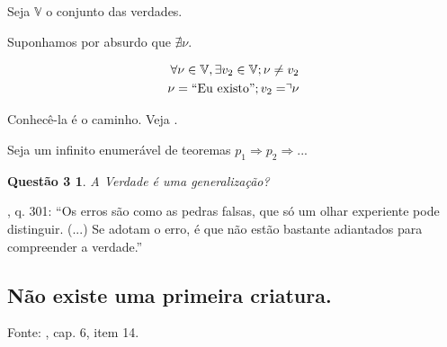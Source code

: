 \documentclass[12pt,a4paper]{article}
\begin{document}
			Seja $\mathbb{V}$ o conjunto das verdades.

			Suponhamos por absurdo que $ \nexists \nu $.

			\begin{align*}
				\forall \nu \in \mathbb{V}, \exists v_2 \in \mathbb{V} ; \nu \neq v_2 \\
				\nu = \mbox{\textquotedblleft Eu existo\textquotedblright}; v_2 = \urcorner \nu
			\end{align*}

			\begin{center}
			\end{center}

			Conhec\^e-la \'e o caminho. Veja \cite{verdade}.

Seja um infinito enumer\'avel de teoremas $p_1 \Rightarrow p_2 \Rightarrow ...$

			\newtheorem{Q3}{Quest\~ao 3}
			\begin{Q3} A Verdade \'e uma generaliza\c{c}\~ao?
			\end{Q3}

			\begin{flushright}
			\end{flushright}

\cite{lm}, q. 301: \textquotedblleft Os erros s\~ao como as pedras falsas, que s\'o um olhar
experiente pode distinguir. (...) Se adotam o erro, \'e que n\~ao est\~ao
bastante adiantados para compreender a verdade.\textquotedblright

		\subsection{N\~ao existe uma primeira criatura.}\label{firstCreature}
			\begin{flushright}
			\end{flushright}

			Fonte: \cite{genese}, cap. 6, item 14.
\end{document}
